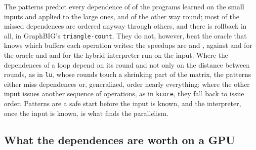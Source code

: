 \documentclass[11pt]{article}
\newcommand{\code}[1]{\texttt{#1}}
\begin{document}
\begin{table}[tbp]
\centering
\footnotesize
\setlength{\tabcolsep}{4pt}

\caption{The hybrid interpreter's dependences on one input set turned into patterns and applied to the other, over
the \numTrPrograms{} benchmarks: programs with no missed dependence, the traced run's dependences missed, the
predicted dependences the run does not have, the rollbacks on the simulated A30, and the geometric-mean speedup
over issuing in order, against the oracle that orders operations sharing a buffer one of them writes, the hybrid
interpreter run on the input itself, and the traced dependences.}
\label{tab:transfer}
\end{table}

The patterns predict every dependence of \numTrSmallLargeNoMiss{} of the \numTrPrograms{} programs learned on the small inputs
and applied to the large ones, and of \numTrLargeSmallNoMiss{} the other way round; most of the missed dependences
are ordered anyway through others, and there is \numTrLargeSmallRb{} rollback in all, in GraphBIG's
\code{triangle-count}. They do not, however, beat the oracle that knows which buffers each operation writes: the
speedups are \numTrSmallLargeSpeedup{} and \numTrLargeSmallSpeedup{}, against \numTrSmallLargeBufRw{} and
\numTrLargeSmallBufRw{} for the oracle and \numTrSmallLargeHy{} and \numTrLargeSmallHy{} for the hybrid interpreter
run on the input. Where the dependences of a loop depend on its round
and not only on the distance between rounds, as in \code{lu}, whose rounds touch a shrinking part of the matrix,
the patterns either miss dependences or, generalized, order nearly everything; where the other input issues
another sequence of operations, as in \code{kcore}, they fall back to issue order. Patterns are a safe start
before the input is known, and the interpreter, once the input is known, is what finds the parallelism.

\begin{table}[tbp]
\centering
\small
\setlength{\tabcolsep}{4pt}

\caption{\code{rodinia\_bfs} on three graphs. ``Same bytes in all graphs'' counts dependences with the same
operations, kind, buffer and unit count in all three. A pattern is a dependence without its position: the names of
its operations, kind, buffer and distance in operations.}
\label{tab:patterns}
\end{table}

\subsection{What the dependences are worth on a GPU}
\label{sec:eval-sim}
\end{document}
